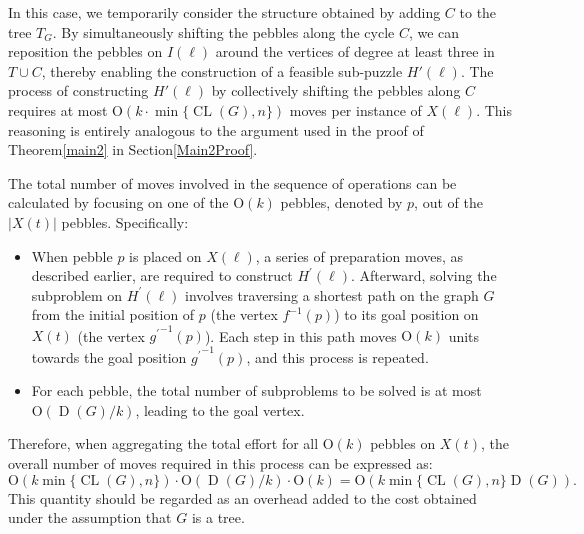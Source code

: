 \documentclass[letter,11pt]{article}
\theoremstyle{definition}
\theoremstyle{definition}
\DeclareMathOperator{\JoiV}{JointVertex}
\DeclareMathOperator{\D}{D}
\DeclareMathOperator{\CL}{CL}
\newcommand{\1}{\boldmath$~1~$\unboldmath}
\newcommand{\Ord}{\mathrm{O}}
\newcommand{\tume}{\hspace*{0.2em}}
\begin{document}
In this case, we temporarily consider the structure obtained by adding $C$ to the tree $T_G$.
By simultaneously shifting the pebbles along the cycle $C$, we can reposition the pebbles on $I(\ell)$ 
around the vertices of degree at least three in $T \cup C$, thereby enabling the construction of a feasible 
sub-puzzle $H'(\ell)$.
The process of constructing $H'(\ell)$ by collectively shifting the pebbles along $C$ requires at most 
$\Ord(k \cdot \min\{\CL(G), n\})$ moves per instance of $X(\ell)$.
This reasoning is entirely analogous to the argument used in the proof of Theorem\tume\ref{main2} 
in Section\tume\ref{Main2Proof}. 

The total number of moves involved in the sequence of operations can be calculated by focusing on 
one of the $\Ord(k)$ pebbles, denoted by $p$, out of the $|X(t)|$ pebbles. Specifically:
\begin{itemize}
\item When pebble $p$ is placed on $X(\ell)$, a series of preparation moves, as described earlier, are required to construct $H^{\prime}(\ell)$. 
Afterward, solving the subproblem on $H^{\prime}(\ell)$ involves traversing a shortest path on the graph $G$ from the initial position of $p$ 
(the vertex $f^{-1}(p)$) to its goal position on $X(t)$ (the vertex ${g^{\prime}}^{-1}(p)$). 
Each step in this path moves $\Ord(k)$ units towards the goal position ${g^{\prime}}^{-1}(p)$, and this process is repeated.
\item For each pebble, the total number of subproblems to be solved is at most $\Ord(\D(G)/k)$, leading to the goal vertex.
\end{itemize}
Therefore, when aggregating the total effort for all $\Ord(k)$ pebbles on $X(t)$, the overall number of moves required 
in this process can be expressed as:
$$
\Ord(k \min\{\CL(G),n\}) \cdot \Ord(\D(G)/k) \cdot \Ord(k) = \Ord(k\min\{\CL(G),n\}\D(G)).
$$
This quantity should be regarded as an overhead added to the cost
obtained under the assumption that $G$ is a tree.
\end{document}
